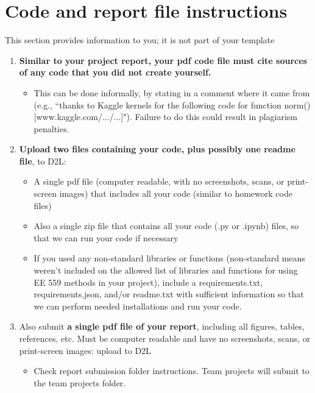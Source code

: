 \documentclass[singlecolumn]{article}
\begin{document}
%

\appendix

\section{Code and report file instructions}

This section provides information to you; it is not part of your template 

\begin{enumerate}
	\item \textbf{Similar to your project report, your pdf code file must cite sources of any code that you did not create yourself.}  
\begin{itemize}
	\item This can be done informally, by stating in a comment where it came from (e.g., ``thanks to Kaggle kernels for the following code for function norm() [www.kaggle.com/.../...]").  Failure to do this could result in plagiarism penalties.
\end{itemize}

	\item \textbf{Upload two files containing your code, plus possibly one readme file}, to D2L:
	\begin{itemize}
		\item A single pdf file (computer readable, with no screenshots, scans, or print-screen images) that includes all your code (similar to homework code files)
		\item Also a single zip file that contains all your code (.py or .ipynb) files, so that we can run your code if necessary
		\item If you used any non-standard libraries or functions (non-standard means weren’t included on the allowed list of libraries and functions for using EE 559 methods in your project), include a requirements.txt, requirements.json, and/or readme.txt with sufficient information so that we can perform needed installations and run your code.  
	\end{itemize}

	\item Also submit \textbf{a single pdf file of your report}, including all figures, tables, references, etc.  Must be computer readable and have no screenshots, scans, or print-screen images: upload to D2L
	\begin{itemize}
		\item Check report submission folder instructions.  Team projects will submit to the team projects folder. 
	\end{itemize}

\end{enumerate} 
\end{document}
